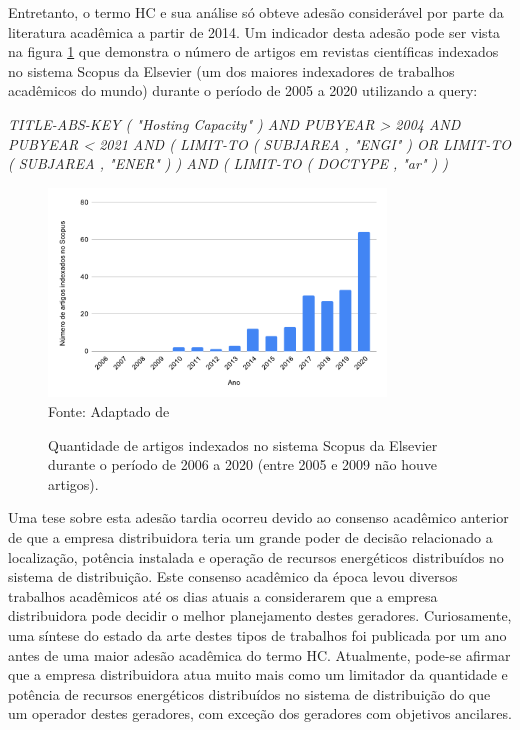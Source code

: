 Entretanto, o termo HC e sua análise só obteve adesão considerável por parte da literatura acadêmica a partir de 2014. Um indicador desta adesão pode ser vista na figura \ref{fig:scopus} que demonstra o número de artigos em revistas científicas indexados no sistema Scopus da Elsevier (um dos maiores indexadores de trabalhos acadêmicos do mundo) durante o período de 2005 a 2020 utilizando a query:

\vspace{-1pt}
\noindent\textit{TITLE-ABS-KEY ( "Hosting Capacity" )  AND  PUBYEAR  >  2004  AND  PUBYEAR  <  2021  AND  ( LIMIT-TO ( SUBJAREA ,  "ENGI" )  OR  LIMIT-TO ( SUBJAREA ,  "ENER" ) )  AND  ( LIMIT-TO ( DOCTYPE ,  "ar" ) )}


\begin{figure}[ht]
 	\centering
    \caption{Quantidade de artigos indexados no sistema Scopus da Elsevier durante o período de 2006 a 2020 (entre 2005 e 2009 não houve artigos).}
    \includegraphics[width=0.8\textwidth]{cap3/chart.pdf}\\
    Fonte: Adaptado de 
    \label{fig:scopus}
\end{figure}

Uma tese sobre esta adesão tardia ocorreu devido ao consenso acadêmico anterior de que a empresa distribuidora teria um grande poder de decisão relacionado a localização, potência instalada e operação de recursos energéticos distribuídos no sistema de distribuição. Este consenso acadêmico da época levou diversos trabalhos acadêmicos até os dias atuais a considerarem que a empresa distribuidora pode decidir o melhor planejamento destes geradores. Curiosamente, uma síntese do estado da arte destes tipos de trabalhos foi publicada por  um ano antes de uma maior adesão acadêmica do termo HC. Atualmente, pode-se afirmar que a empresa distribuidora atua muito mais como um limitador da quantidade e potência de recursos energéticos distribuídos no sistema de distribuição do que um operador destes geradores, com exceção dos geradores com objetivos ancilares.


